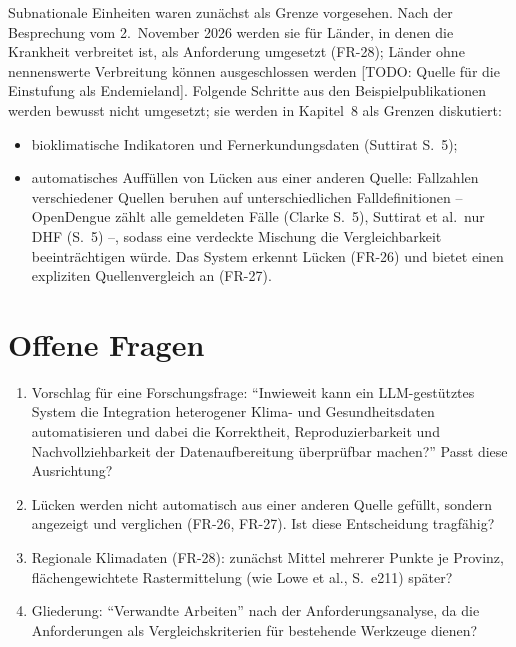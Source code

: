 \documentclass[11pt,a4paper]{article}
\newcommand{\todo}[1]{\textcolor{red!70!black}{[TODO: #1]}}
\begin{document}
Subnationale Einheiten waren zunächst als Grenze vorgesehen. Nach der
Besprechung vom 2.~November 2026 werden sie für Länder, in denen die Krankheit
verbreitet ist, als Anforderung umgesetzt (FR-28); Länder ohne nennenswerte
Verbreitung können ausgeschlossen werden \todo{Quelle für die Einstufung als
Endemieland}. Folgende Schritte aus den Beispielpublikationen werden bewusst nicht
umgesetzt; sie werden in Kapitel~8 als Grenzen diskutiert:
\begin{itemize}[nosep]
  \item bioklimatische Indikatoren und Fernerkundungsdaten (Suttirat S.~5);
  \item automatisches Auffüllen von Lücken aus einer anderen Quelle: Fallzahlen
        verschiedener Quellen beruhen auf unterschiedlichen Falldefinitionen --
        OpenDengue zählt alle gemeldeten Fälle (Clarke S.~5), Suttirat et al.\
        nur DHF (S.~5) --, sodass eine verdeckte Mischung die Vergleichbarkeit
        beeinträchtigen würde. Das System erkennt Lücken (FR-26) und bietet einen
        expliziten Quellenvergleich an (FR-27).
\end{itemize}

\section*{Offene Fragen}\label{sec:fragen}
\begin{enumerate}[nosep]
  \item Vorschlag für eine Forschungsfrage: \enquote{Inwieweit kann ein
        LLM-gestütztes System die Integration heterogener Klima- und
        Gesundheitsdaten automatisieren und dabei die Korrektheit,
        Reproduzierbarkeit und Nachvollziehbarkeit der Datenaufbereitung
        überprüfbar machen?} Passt diese Ausrichtung?
  \item Lücken werden nicht automatisch aus einer anderen Quelle gefüllt, sondern
        angezeigt und verglichen (FR-26, FR-27). Ist diese Entscheidung tragfähig?
  \item Regionale Klimadaten (FR-28): zunächst Mittel mehrerer Punkte je Provinz,
        flächengewichtete Rastermittelung (wie Lowe et al., S.~e211) später?
  \item Gliederung: \enquote{Verwandte Arbeiten} nach der Anforderungsanalyse, da
        die Anforderungen als Vergleichskriterien für bestehende Werkzeuge dienen?
\end{enumerate}
\end{document}
